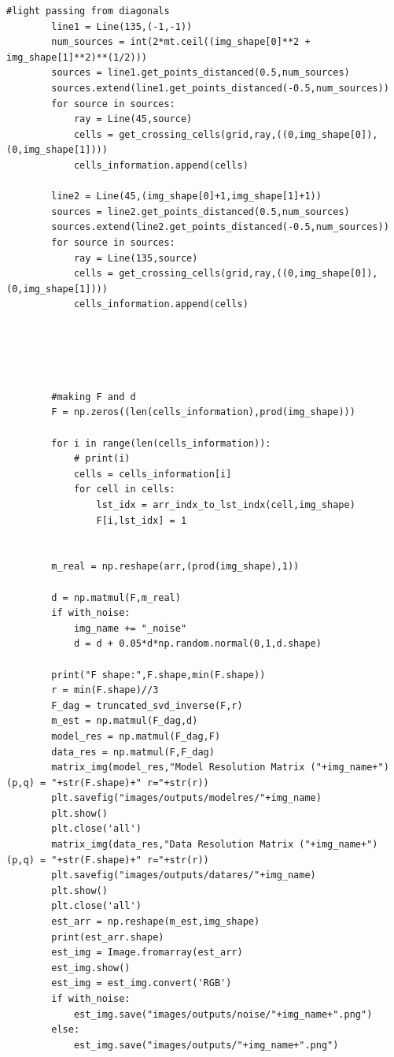 \documentclass{article}
\begin{document}
\begin{lstlisting}[style=python]
        #light passing from diagonals
        line1 = Line(135,(-1,-1))
        num_sources = int(2*mt.ceil((img_shape[0]**2 + img_shape[1]**2)**(1/2)))
        sources = line1.get_points_distanced(0.5,num_sources)
        sources.extend(line1.get_points_distanced(-0.5,num_sources))
        for source in sources:
            ray = Line(45,source)
            cells = get_crossing_cells(grid,ray,((0,img_shape[0]),(0,img_shape[1])))
            cells_information.append(cells)
    
        line2 = Line(45,(img_shape[0]+1,img_shape[1]+1))
        sources = line2.get_points_distanced(0.5,num_sources)
        sources.extend(line2.get_points_distanced(-0.5,num_sources))
        for source in sources:
            ray = Line(135,source)
            cells = get_crossing_cells(grid,ray,((0,img_shape[0]),(0,img_shape[1])))
            cells_information.append(cells)
    
    
    
    
    
        #making F and d
        F = np.zeros((len(cells_information),prod(img_shape)))
    
        for i in range(len(cells_information)):
            # print(i)
            cells = cells_information[i] 
            for cell in cells:
                lst_idx = arr_indx_to_lst_indx(cell,img_shape)
                F[i,lst_idx] = 1
    
    
        m_real = np.reshape(arr,(prod(img_shape),1))
    
        d = np.matmul(F,m_real)
        if with_noise:
            img_name += "_noise"
            d = d + 0.05*d*np.random.normal(0,1,d.shape)
    
        print("F shape:",F.shape,min(F.shape))
        r = min(F.shape)//3
        F_dag = truncated_svd_inverse(F,r)
        m_est = np.matmul(F_dag,d)
        model_res = np.matmul(F_dag,F)
        data_res = np.matmul(F,F_dag)
        matrix_img(model_res,"Model Resolution Matrix ("+img_name+") (p,q) = "+str(F.shape)+" r="+str(r))
        plt.savefig("images/outputs/modelres/"+img_name)
        plt.show()
        plt.close('all')
        matrix_img(data_res,"Data Resolution Matrix ("+img_name+") (p,q) = "+str(F.shape)+" r="+str(r))
        plt.savefig("images/outputs/datares/"+img_name)
        plt.show()
        plt.close('all')
        est_arr = np.reshape(m_est,img_shape)
        print(est_arr.shape)
        est_img = Image.fromarray(est_arr)
        est_img.show()
        est_img = est_img.convert('RGB')
        if with_noise:
            est_img.save("images/outputs/noise/"+img_name+".png")
        else:
            est_img.save("images/outputs/"+img_name+".png")
\end{lstlisting}
\end{document}
